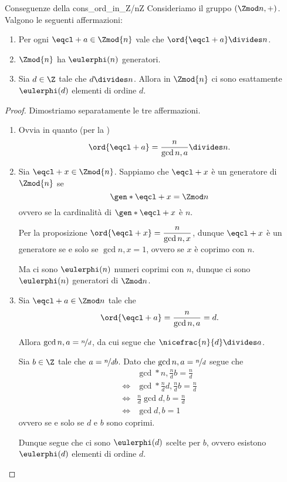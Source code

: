 \begin{corollary}
    {Conseguenze della }
    {cons_ord_in_Z/nZ}
    Consideriamo il gruppo $(\Zmod n, +)$. Valgono le seguenti affermazioni:
    \begin{enumerate}[label={(\roman*)}]
        \item \label{cor:cons_ord_in_Z/nZ:ord_a_div_n} Per ogni $\eqcl+{a} \in \Zmod{n}$ vale che $\ord{\eqcl+ a} \divides n$.
        \item \label{cor:cons_ord_in_Z/nZ:phi(n)_gen} $\Zmod{n}$ ha $\eulerphi(n)$ generatori.
        \item \label{cor:cons_ord_in_Z/nZ:phi(d)_el} Sia $d \in \Z$ tale che $d \divides n$. Allora in $\Zmod{n}$ ci sono esattamente $\eulerphi(d)$ elementi di ordine $d$.
    \end{enumerate}
\end{corollary}
\begin{proof}
    Dimostriamo separatamente le tre affermazioni.
    \begin{enumerate}[label={(\roman*)}]
        \item Ovvia in quanto (per la ) \[
            \ord{\eqcl+ a} = \dfrac{n}{\gcd{n, a}} \divides n.
        \]
        \item Sia $\eqcl+ x \in \Zmod{n}$. Sappiamo che $\eqcl+ x$ è un generatore di $\Zmod{n}$ se \[
            \gen*{\eqcl+ x} = \Zmod n    
        \] ovvero se la cardinalità di $\gen*{\eqcl+ x}$ è $n$.

        Per la proposizione  $\ord{\eqcl+ x} = \dfrac{n}{\gcd{n, x}}$, dunque $\eqcl+ x$ è un generatore se e solo se $\gcd{n, x} = 1$, ovvero se $x$ è coprimo con $n$.

        Ma ci sono $\eulerphi(n)$ numeri coprimi con $n$, dunque ci sono $\eulerphi(n)$ generatori di $\Zmod n$.
        \item Sia $\eqcl+ a \in \Zmod n$ tale che \[
            \ord{\eqcl+ a} = \frac{n}{\gcd{n, a}} = d.    
        \]

        Allora $\gcd{n, a} = \nicefrac{n}{d}$, da cui segue che $\nicefrac{n}{d} \divides a$.

        Sia $b \in \Z$ tale che $a = \nicefrac{n}{d}b$. Dato che $\gcd{n, a} = \nicefrac{n}{d}$ segue che \begin{align*}
            &\gcd*{n, \frac{n}{d}b} = \frac{n}{d}\\[3pt]
            \iff &\gcd*{\frac{n}{d}d, \frac{n}{d}b} = \frac{n}{d}\\[3pt]
            \iff &\frac{n}{d}\gcd{d, b} = \frac{n}{d}\\[3pt]
            \iff &\gcd{d, b} = 1
        \end{align*}
        ovvero se e solo se $d$ e $b$ sono coprimi.

        Dunque segue che ci sono $\eulerphi(d)$ scelte per $b$, ovvero esistono $\eulerphi(d)$ elementi di ordine $d$.
    \end{enumerate}
\end{proof}

